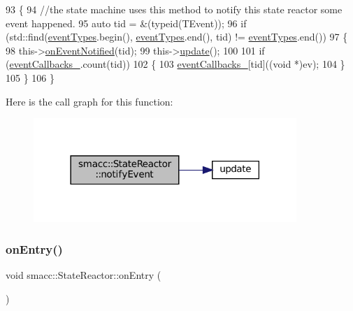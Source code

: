 \begin{DoxyCode}
93     \{
94         \textcolor{comment}{//the state machine uses this method to notify this state reactor some event happened.}
95         \textcolor{keyword}{auto} tid = &(\textcolor{keyword}{typeid}(TEvent));
96         \textcolor{keywordflow}{if} (std::find(\hyperlink{classsmacc_1_1StateReactor_a65c8ddfce40e7859e5c73fff1cf6c04b}{eventTypes}.begin(), \hyperlink{classsmacc_1_1StateReactor_a65c8ddfce40e7859e5c73fff1cf6c04b}{eventTypes}.end(), tid) != 
      \hyperlink{classsmacc_1_1StateReactor_a65c8ddfce40e7859e5c73fff1cf6c04b}{eventTypes}.end())
97         \{
98             this->\hyperlink{classsmacc_1_1StateReactor_a17646b3c68a6d80d1e4da8c14238ce36}{onEventNotified}(tid);
99             this->\hyperlink{classsmacc_1_1StateReactor_aca5d4f7af06532272db55943b7810a43}{update}();
100 
101             \textcolor{keywordflow}{if} (\hyperlink{classsmacc_1_1StateReactor_a63cce05c412f3699cc1b15af9aeaf8af}{eventCallbacks\_}.count(tid))
102             \{
103                 \hyperlink{classsmacc_1_1StateReactor_a63cce05c412f3699cc1b15af9aeaf8af}{eventCallbacks\_}[tid]((\textcolor{keywordtype}{void} *)ev);
104             \}
105         \}
106     \}
\end{DoxyCode}
Here is the call graph for this function\+:
\nopagebreak
\begin{figure}[H]
\begin{center}
\leavevmode
\includegraphics[width=282pt]{classsmacc_1_1StateReactor_a9e1b551ab97d1c18b2e1bb60a60455da_cgraph}
\end{center}
\end{figure}
\mbox{\label{classsmacc_1_1StateReactor_a11ed02721fd751b8272540645b88f4a6}} 
\subsubsection{\texorpdfstring{on\+Entry()}{onEntry()}}
{\footnotesize\ttfamily void smacc\+::\+State\+Reactor\+::on\+Entry (\begin{DoxyParamCaption}{ }\end{DoxyParamCaption})\hspace{0.3cm}{\ttfamily [virtual]}}



